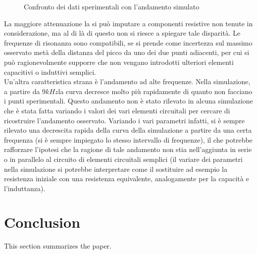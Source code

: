 \documentclass[journal, a4paper]{IEEEtran}
\begin{document}
\begin{figure}[htp]
\centering
\caption{Confronto dei dati sperimentali con l'andamento simulato}
\end{figure}

La maggiore attenuazione la si può imputare a componenti resistive non tenute in considerazione, ma al di là di questo non si riesce a spiegare tale disparità. Le frequenze di risonanza sono compatibili, se si prende come incertezza sul massimo osservato metà della distanza del picco da uno dei due punti adiacenti, per cui si può ragionevolmente supporre che non vengano introdotti ulteriori elementi capacitivi o induttivi semplici. \\

Un'altra caratteristica strana è l'andamento ad alte frequenze. Nella simulazione, a partire da $9 \si{kHz} $la curva decresce molto più rapidamente di quanto non facciano i punti sperimentali. Questo andamento non è stato rilevato in alcuna simulazione che è stata fatta variando i valori dei vari elementi circuitali per cercare di ricostruire l'andamento osservato. Variando i vari parametri infatti, si è sempre rilevato una decrescita rapida della curva della simulazione a partire da una certa frequenza (si è sempre impiegato lo stesso intervallo di frequenze), il che potrebbe rafforzare l'ipotesi che la ragione di tale andamento non stia nell'aggiunta in serie o in parallelo al circuito di elementi circuitali semplici (il variare dei parametri nella simulazione si potrebbe interpretare come il sostituire ad esempio la resistenza iniziale con una resistenza equivalente, analogamente per la capacità e l'induttanza).


\section{Conclusion}
	This section summarizes the paper.
\end{document}
